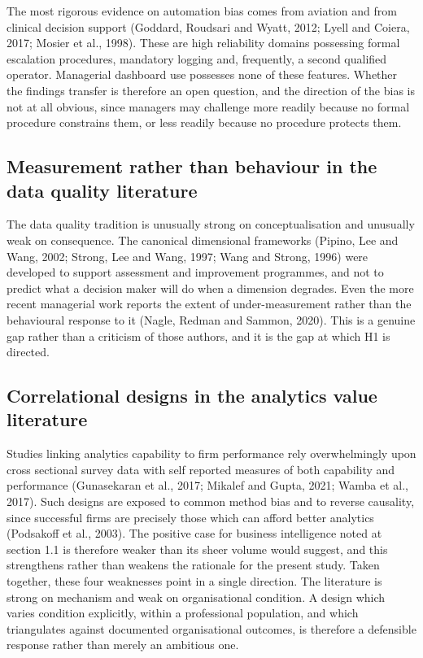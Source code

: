 \documentclass[12pt,a4paper]{article}
\begin{document}
The most rigorous evidence on automation bias comes from aviation and from clinical decision
support (Goddard, Roudsari and Wyatt, 2012; Lyell and Coiera, 2017; Mosier et al., 1998). These
are high reliability domains possessing formal escalation procedures, mandatory logging and,
frequently, a second qualified operator. Managerial dashboard use possesses none of these
features. Whether the findings transfer is therefore an open question, and the direction of the
bias is not at all obvious, since managers may challenge more readily because no formal procedure
constrains them, or less readily because no procedure protects them.

\subsection{Measurement rather than behaviour in the data quality literature}

The data quality tradition is unusually strong on conceptualisation and unusually weak on
consequence. The canonical dimensional frameworks (Pipino, Lee and Wang, 2002; Strong, Lee and
Wang, 1997; Wang and Strong, 1996) were developed to support assessment and improvement
programmes, and not to predict what a decision maker will do when a dimension degrades. Even the
more recent managerial work reports the extent of under-measurement rather than the behavioural
response to it (Nagle, Redman and Sammon, 2020). This is a genuine gap rather than a criticism of
those authors, and it is the gap at which H1 is directed.

\subsection{Correlational designs in the analytics value literature}

Studies linking analytics capability to firm performance rely overwhelmingly upon cross sectional
survey data with self reported measures of both capability and performance (Gunasekaran et al.,
2017; Mikalef and Gupta, 2021; Wamba et al., 2017). Such designs are exposed to common method bias
and to reverse causality, since successful firms are precisely those which can afford better
analytics (Podsakoff et al., 2003). The positive case for business intelligence noted at section
1.1 is therefore weaker than its sheer volume would suggest, and this strengthens rather than
weakens the rationale for the present study. Taken together, these four weaknesses point in a
single direction. The literature is strong on mechanism and weak on organisational condition. A
design which varies condition explicitly, within a professional population, and which triangulates
against documented organisational outcomes, is therefore a defensible response rather than merely
an ambitious one.
\end{document}
